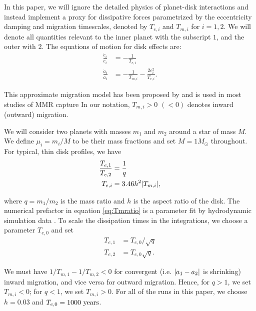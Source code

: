 \documentclass[usenatbib,twocolumn]{mnras}
\DeclarePairedDelimiter{\abs}{|}{|}
\begin{document}
In this paper, we will ignore the detailed physics of planet-disk
interactions and instead implement a proxy for dissipative forces
parametrized by the eccentricity damping and migration timescales,
denoted by \(T_{e,i}\) and \(T_{m,i}\) for \(i=1,2\).  We will denote all
quantities relevant to the inner planet with the subscript \(1\), and the
outer with \(2\).  The equations of motion for disk effects are:
\begin{align}\label{eq:disforce}
  \frac{\dot{e}_i}{e_i} &= -\frac{1}{T_{e,i}} \\
\label{eq:disforce1}
  \frac{\dot{a}_i}{a_i} &= -\frac{1}{T_{m,i}} -\frac{2e_i^2}{T_{e,i}}.
\end{align}

\noindent This approximate migration model has been proposed
by \citet{goldreich_disk-satellite_1980-1} and is used in most studies
of MMR capture
\citep[e.g.][]{goldreich_overstable_2014,xu_migration_2018} In our
notation, \(T_{m,i}>0\) \((<0)\) denotes inward (outward) migration.

We will consider two planets with masses \(m_1\) and \(m_2\) around a star
of mass \(M\). We define \(\mu_i=m_i/M\) to be their mass fractions
and set \(M=1M_\odot\) throughout. For typical, thin disk profiles, we
have
\citep{tanaka_three-dimensional_2004,cresswell_three-dimensional_2008,xu_migration_2018}
\begin{align}
  \label{eq:Teratio}
  \frac{T_{e,1}}{T_{e,2}}&= \frac1q\\
  \label{eq:Tmratio}
  T_{e,i}&=3.46 h^2 \abs{T_{m,i}},
\end{align}

\noindent where \(q=m_1/m_2\) is the mass ratio and \(h\) is the
aspect ratio of the disk.
The numerical prefactor in equation \eqref{eq:Tmratio} is a parameter fit 
by hydrodynamic simulation data \citep[for details see][]{cresswell_three-dimensional_2008}.
To scale the dissipation times in the
integrations, we choose a parameter \(T_{e,0}\) and set
\begin{align}
  T_{e,1}&=T_{e,0}/\sqrt{q}\\
  T_{e,2}&= T_{e,0}\sqrt{q}.
\end{align}

\noindent We must have \(1/T_{m,1} - 1/T_{m,2} < 0\) for
convergent (i.e. \(\abs{a_1-a_2}\) is shrinking) inward migration, and
vice versa for outward migration.  Hence, for \(q>1\), we set \(T_{m,i}<
0\); for \(q<1\), we set \(T_{m,i}>0\).  For all of the runs in this paper,
we choose \(h=0.03\) and \(T_{e,0}=1000~\rm{years}\).
\end{document}
